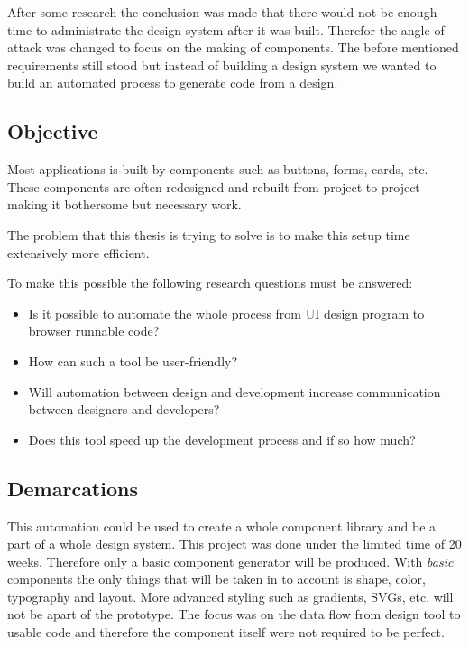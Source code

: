 After some research the conclusion was made that there would not be enough time to administrate the design system after it was built. Therefor the angle of attack was changed to focus on the making of components. The before mentioned requirements still stood but instead of building a design system we wanted to build an automated process to generate code from a design. 








\subsection{Objective}
Most applications is built by components such as buttons, forms, cards\cite{babichSimpleDesignTips2020}, etc. These components are often redesigned and rebuilt from project to project making it bothersome but necessary work.

The problem that this thesis is trying to solve is to make this setup time extensively more efficient. 

To make this possible the following research questions must be answered:
\begin{itemize}
  \item Is it possible to automate the whole process from UI design program to browser runnable code? 
  \item How can such a tool be user-friendly?   
  \item Will automation between design and development increase communication between designers and developers?
  \item Does this tool speed up the development process and if so how much?
\end{itemize}

\subsection{Demarcations}%
\label{sub:Demarcations}
This automation could be used to create a whole component library and be a part of a whole design system. This project was done under the limited time of 20 weeks. Therefore only a basic component generator will be produced. With \textit{basic} components the only things that will be taken in to account is shape, color, typography and layout. More advanced styling such as gradients, SVGs, etc. will not be apart of the prototype. 
The focus was on the data flow from design tool to usable code and therefore the component itself were not required to be perfect.

